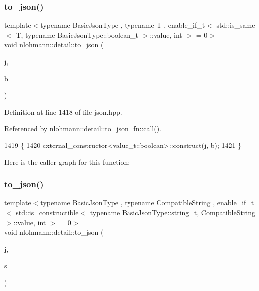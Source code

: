 \subsubsection{\texorpdfstring{to\+\_\+json()}{to\_json()}\hspace{0.1cm}{\footnotesize\ttfamily [1/16]}}
{\footnotesize\ttfamily template$<$typename Basic\+Json\+Type , typename T , enable\+\_\+if\+\_\+t$<$ std\+::is\+\_\+same$<$ T, typename Basic\+Json\+Type\+::boolean\+\_\+t $>$\+::value, int $>$  = 0$>$ \\
void nlohmann\+::detail\+::to\+\_\+json (\begin{DoxyParamCaption}\item[{Basic\+Json\+Type \&}]{j,  }\item[{T}]{b }\end{DoxyParamCaption})\hspace{0.3cm}{\ttfamily [noexcept]}}



Definition at line 1418 of file json.\+hpp.



Referenced by nlohmann\+::detail\+::to\+\_\+json\+\_\+fn\+::call().


\begin{DoxyCode}
1419 \{
1420     external\_constructor<value\_t::boolean>::construct(j, b);
1421 \}
\end{DoxyCode}
Here is the caller graph for this function\+:
\mbox{\label{namespacenlohmann_1_1detail_a7356ed05cdbbb080cee80e1211e1c6c9}} 
\subsubsection{\texorpdfstring{to\+\_\+json()}{to\_json()}\hspace{0.1cm}{\footnotesize\ttfamily [2/16]}}
{\footnotesize\ttfamily template$<$typename Basic\+Json\+Type , typename Compatible\+String , enable\+\_\+if\+\_\+t$<$ std\+::is\+\_\+constructible$<$ typename Basic\+Json\+Type\+::string\+\_\+t, Compatible\+String $>$\+::value, int $>$  = 0$>$ \\
void nlohmann\+::detail\+::to\+\_\+json (\begin{DoxyParamCaption}\item[{Basic\+Json\+Type \&}]{j,  }\item[{const Compatible\+String \&}]{s }\end{DoxyParamCaption})}



